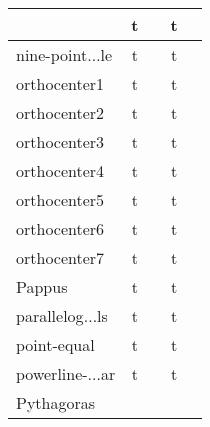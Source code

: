 {\begin{longtable}{|l|*{2}{cr|}}
& \cellcolor{green!50}t & \cellcolor{green!50}{\bf 29} 
& \cellcolor{green!30}t & \cellcolor{green!30}{\sl 258} 
\\ \hline
\cellcolor{blue!10}nine-point$\ldots$le 
& \cellcolor{green!40}t & \cellcolor{green!40}{\bf 57} 
& \cellcolor{green!30}t & \cellcolor{green!30}{\sl 271} 
\\ \hline
\cellcolor{blue!10}orthocenter1 
& \cellcolor{green!50}t & \cellcolor{green!50}{\bf 40} 
& \cellcolor{green!30}t & \cellcolor{green!30}{\sl 266} 
\\ \hline
\cellcolor{blue!10}orthocenter2 
& \cellcolor{green!50}t & \cellcolor{green!50}{\bf 36} 
& \cellcolor{green!30}t & \cellcolor{green!30}{\sl 243} 
\\ \hline
\cellcolor{blue!10}orthocenter3 
& \cellcolor{green!50}t & \cellcolor{green!50}{\bf 33} 
& \cellcolor{green!30}t & \cellcolor{green!30}{\sl 268} 
\\ \hline
\cellcolor{blue!10}orthocenter4 
& \cellcolor{green!50}t & \cellcolor{green!50}{\bf 36} 
& \cellcolor{green!30}t & \cellcolor{green!30}{\sl 242} 
\\ \hline
\cellcolor{blue!10}orthocenter5 
& \cellcolor{green!40}t & \cellcolor{green!40}{\bf 123} 
& \cellcolor{green!30}t & \cellcolor{green!30}{\sl 249} 
\\ \hline
\cellcolor{blue!10}orthocenter6 
& \cellcolor{green!50}t & \cellcolor{green!50}{\bf 33} 
& \cellcolor{green!30}t & \cellcolor{green!30}{\sl 244} 
\\ \hline
\cellcolor{blue!10}orthocenter7 
& \cellcolor{green!40}t & \cellcolor{green!40}{\bf 73} 
& \cellcolor{green!30}t & \cellcolor{green!30}{\sl 261} 
\\ \hline
\cellcolor{blue!10}Pappus 
& \cellcolor{green!50}t & \cellcolor{green!50}{\bf 41} 
& \cellcolor{green!20}t & \cellcolor{green!20}{\sl 576} 
\\ \hline
\cellcolor{blue!10}parallelog$\ldots$ls 
& \cellcolor{green!40}t & \cellcolor{green!40}{\bf 99} 
& \cellcolor{green!30}t & \cellcolor{green!30}{\sl 259} 
\\ \hline
\cellcolor{blue!10}point-equal 
& \cellcolor{green!40}t & \cellcolor{green!40}{\bf 69} 
& \cellcolor{green!30}t & \cellcolor{green!30}{\sl 236} 
\\ \hline
\cellcolor{blue!10}powerline-$\ldots$ar 
& \cellcolor{green!50}t & \cellcolor{green!50}{\bf 41} 
& \cellcolor{green!30}t & \cellcolor{green!30}{\sl 253} 
\\ \hline
\cellcolor{blue!10}Pythagoras 
& \cellcolor{yellow!25} & \cellcolor{yellow!25}{ 13} 

\end{longtable}}
